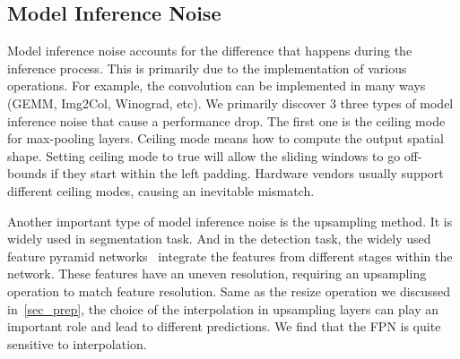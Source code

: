 

\newcommand{\mypm}[1]{{~(#1)}}



\subsection{Model Inference Noise}
Model inference noise accounts for the difference that happens during the inference process. This is primarily due to the implementation of various operations. For example, the convolution can be implemented in many ways (GEMM, Img2Col, Winograd, etc). 
We primarily discover 3 three types of model inference noise that cause a performance drop. 
The first one is the ceiling mode for max-pooling layers. Ceiling mode means how to compute the output spatial shape. Setting ceiling mode to true will allow the sliding windows to go off-bounds if they start within the left padding. Hardware vendors usually support different ceiling modes, causing an inevitable mismatch. %


Another important type of model inference noise is the upsampling method. It is widely used in segmentation task. And in the detection task, the widely used feature pyramid networks~\cite{lin2017feature} integrate the features from different stages within the network. These features have an uneven resolution, requiring an upsampling operation to match feature resolution. Same as the resize operation we discussed in~\autoref{sec_prep}, the choice of the interpolation in upsampling layers can play an important role and lead to different predictions. We find that the FPN is quite sensitive to interpolation. 

